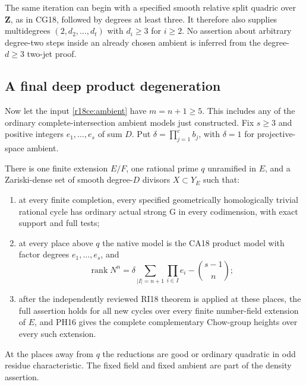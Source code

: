 The same iteration can begin with a specified smooth
relative split quadric over $\mathbf Z$, as in CG18,
followed by degrees at least three.  It therefore
also supplies multidegrees $(2,d_2,\ldots,d_t)$ with
$d_i\ge3$ for $i\ge2$.  No assertion about arbitrary
degree-two steps inside an already chosen ambient
is inferred from the degree-$d\ge3$ two-jet proof.

\subsection{A final deep product degeneration}

Now let the input \eqref{r18ce:ambient} have
$m=n+1\ge5$.  This includes any of the ordinary
complete-intersection ambient models just constructed.
Fix $s\ge3$ and positive integers $e_1,\ldots,e_s$
of sum $D$.  Put $\delta=\prod_{j=1}^c b_j$,
with $\delta=1$ for projective-space ambient.

\begin{theorem}
\label{r18ce:deep-family}
There is one finite extension $E/F$, one rational
prime $q$ unramified in $E$, and a Zariski-dense
set of smooth degree-$D$ divisors $X\subset Y_E$
such that:
\begin{enumerate}
\item at every finite completion, every specified
      geometrically homologically trivial rational
      cycle has ordinary actual strong G in every
      codimension, with exact support and full tests;
\item at every place above $q$ the native model is
      the CA18 product model with factor degrees
      $e_1,\ldots,e_s$, and
      \[
       \operatorname{rank}N^n
        =\delta\sum_{|I|=n+1}\prod_{i\in I}e_i
                                -\binom{s-1}{n};
       \tag{CE18.5}\label{r18ce:monodromy}
      \]
\item after the independently reviewed RI18 theorem
      is applied at these places, the full assertion
      holds for all new cycles over every finite
      number-field extension of $E$, and PH16 gives
      the complete complementary Chow-group heights
      over every such extension.
\end{enumerate}
At the places away from $q$ the reductions are good
or ordinary quadratic in odd residue characteristic.
The fixed field and fixed ambient are part of the
density assertion.
\end{theorem}

